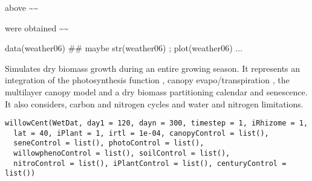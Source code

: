 \documentclass[letterpaper]{book}
\begin{document}
%
\begin{Details}\relax

above \textasciitilde{}\textasciitilde{}
\end{Details}
%
\begin{Source}\relax

were obtained \textasciitilde{}\textasciitilde{}
\end{Source}
%
\begin{Examples}
\begin{ExampleCode}
data(weather06)
## maybe str(weather06) ; plot(weather06) ...
\end{ExampleCode}
\end{Examples}
%
\begin{Description}\relax
Simulates dry biomass growth during an entire growing
season.  It represents an integration of the photosynthesis
function , canopy evapo/transpiration
, the multilayer canopy model
 and a dry biomass partitioning calendar
and senescence. It also considers, carbon and nitrogen
cycles and water and nitrogen limitations.
\end{Description}
%
\begin{Usage}
\begin{verbatim}
willowCent(WetDat, day1 = 120, dayn = 300, timestep = 1, iRhizome = 1,
  lat = 40, iPlant = 1, irtl = 1e-04, canopyControl = list(),
  seneControl = list(), photoControl = list(),
  willowphenoControl = list(), soilControl = list(),
  nitroControl = list(), iPlantControl = list(), centuryControl = list())
\end{verbatim}
\end{Usage}
%
\end{document}
